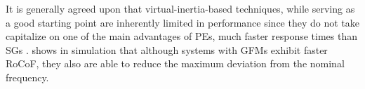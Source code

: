 It is generally agreed upon that virtual-inertia-based techniques, while serving
as a good starting point are inherently limited in performance since they do not
take capitalize on one of the main advantages of PEs, much faster response times
than SGs \cite{milano_foundations_2018}. \cite{kenyon_interactive_2023} shows
in simulation that although systems with GFMs exhibit faster RoCoF, they also
are able to reduce the maximum deviation from the nominal frequency. 


